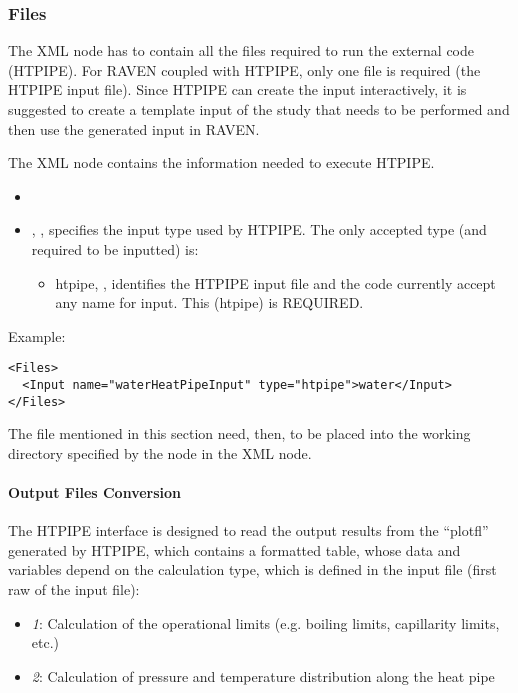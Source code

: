 \subsubsection{Files}
The  XML node has to contain all the files required to run the external code  (HTPIPE).
For RAVEN coupled with HTPIPE, only one file is required (the HTPIPE input file). 
\nb Since HTPIPE can create the input interactively, it is suggested to create a template input of the study that needs to be performed and then use the generated input in RAVEN.

The   XML node contains the information needed to execute HTPIPE.

\attrsIntro
%

\begin{itemize}
  \itemsep0em
  \item \nameDescription
  \item {}, , specifies the
  input type used by HTPIPE. The only accepted type (and required to be inputted) is: 
  \begin{itemize}
    \item htpipe, , identifies the HTPIPE input file and the code currently accept any name for input. This  (htpipe) is REQUIRED.
  \end{itemize}
\end{itemize}

Example:

\begin{lstlisting}[style=XML]
<Files>
  <Input name="waterHeatPipeInput" type="htpipe">water</Input>
</Files>
\end{lstlisting}
The file mentioned in this section
need, then, to be placed into the working directory specified
by the  node in the  XML node.

\paragraph{Output Files Conversion}
The HTPIPE interface is designed to read the output results from the ``plotfl'' generated by HTPIPE, which contains a formatted
table, whose data and variables depend on the calculation type, which is defined in the input file (first raw of the input file):
\begin{itemize}
  \item \textit{1}: Calculation of the operational limits (e.g. boiling limits, capillarity limits, etc.)
  \item \textit{2}: Calculation of pressure and temperature distribution along the heat pipe 
\end{itemize}

